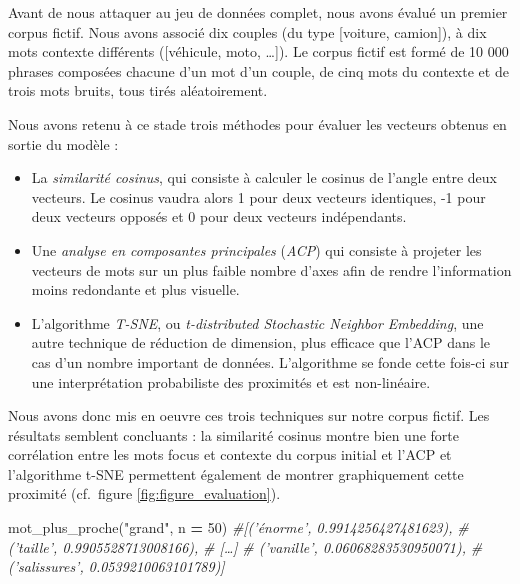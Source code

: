 \documentclass[11pt,french,french]{article}
\newenvironment{Shaded}{\begin{snugshade}}{\end{snugshade}}
\newcommand{\CommentTok}[1]{\textcolor[rgb]{0.56,0.35,0.01}{\textit{#1}}}
\newcommand{\DecValTok}[1]{\textcolor[rgb]{0.00,0.00,0.81}{#1}}
\newcommand{\NormalTok}[1]{#1}
\newcommand{\OperatorTok}[1]{\textcolor[rgb]{0.81,0.36,0.00}{\textbf{#1}}}
\newcommand{\StringTok}[1]{\textcolor[rgb]{0.31,0.60,0.02}{#1}}
\begin{document}
Avant de nous attaquer au jeu de données complet, nous avons évalué un
premier corpus fictif. Nous avons associé dix couples (du type
{[}voiture, camion{]}), à dix mots contexte différents ({[}véhicule,
moto, \ldots{}{]}). Le corpus fictif est formé de 10 000 phrases
composées chacune d'un mot d'un couple, de cinq mots du contexte et de
trois mots bruits, tous tirés aléatoirement.

Nous avons retenu à ce stade trois méthodes pour évaluer les vecteurs
obtenus en sortie du modèle :

\begin{itemize}
\item
  La \emph{similarité cosinus}, qui consiste à calculer le cosinus de
  l'angle entre deux vecteurs. Le cosinus vaudra alors 1 pour deux
  vecteurs identiques, -1 pour deux vecteurs opposés et 0 pour deux
  vecteurs indépendants.
\item
  Une \emph{analyse en composantes principales} (\emph{ACP}) qui
  consiste à projeter les vecteurs de mots sur un plus faible nombre
  d'axes afin de rendre l'information moins redondante et plus visuelle.
\item
  L'algorithme \emph{T-SNE}, ou \emph{t-distributed Stochastic Neighbor
  Embedding}, une autre technique de réduction de dimension, plus
  efficace que l'ACP dans le cas d'un nombre important de données.
  L'algorithme se fonde cette fois-ci sur une interprétation
  probabiliste des proximités et est non-linéaire.
\end{itemize}

Nous avons donc mis en oeuvre ces trois techniques sur notre corpus
fictif. Les résultats semblent concluants : la similarité cosinus montre
bien une forte corrélation entre les mots focus et contexte du corpus
initial et l'ACP et l'algorithme t-SNE permettent également de montrer
graphiquement cette proximité (cf.~figure \ref{fig:figure_evaluation}).

\footnotesize

\begin{Shaded}
\begin{Highlighting}[]
\NormalTok{mot_plus_proche(}\StringTok{"grand"}\NormalTok{, n }\OperatorTok{=} \DecValTok{50}\NormalTok{)}
\CommentTok{#[('énorme', 0.9914256427481623),}
\CommentTok{# ('taille', 0.9905528713008166),}
\CommentTok{# […]}
\CommentTok{# ('vanille', 0.06068283530950071),}
\CommentTok{# ('salissures', 0.0539210063101789)]}
\end{Highlighting}
\end{Shaded}
\end{document}
